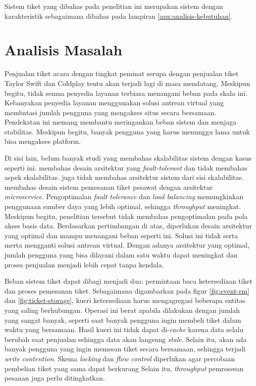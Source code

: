Sistem tiket yang dibahas pada penelitian ini merupakan sistem dengan karakteristik sebagaimana dibahas pada lampiran \ref{apx:analisis-kebutuhan}.

\section{Analisis Masalah}

Penjualan tiket acara dengan tingkat peminat serupa dengan penjualan tiket Taylor Swift dan Coldplay tentu akan terjadi lagi di masa mendatang. Meskipun begitu, tidak semua penyedia layanan terbiasa menangani beban pada skala ini. Kebanyakan penyedia layanan menggunakan solusi antrean virtual yang membatasi jumlah pengguna yang mengakses situs secara bersamaan. Pendekatan ini memang membantu meringankan beban sistem dan menjaga stabilitas. Meskipun begitu, banyak pengguna yang harus menunggu lama untuk bisa mengakses platform.

Di sisi lain, belum banyak studi yang membahas skalabilitas sistem dengan kasus seperti ini. \cite{microservicesEventDriven} membahas desain arsitektur yang \textit{fault-tolerant} dan tidak membahas aspek skalabilitas. \cite{backendForTicketing} juga tidak membahas arsitektur sistem dari sisi skalabilitas. \cite{barua2024enhancingresiliencescalabilitytravel} membahas desain sistem pemesanan tiket pesawat dengan arsitektur \textit{microservice}. Pengoptimalan \textit{fault tolerance} dan \textit{load balancing} memungkinkan penggunaan sumber daya yang lebih optimal, sehingga \textit{throughput} meningkat. Meskipun begitu, penelitian tersebut tidak membahas pengoptimalan pada pola akses basis data. Berdasarkan pertimbangan di atas, diperlukan desain arsitektur yang optimal dan mampu menangani beban seperti ini. Solusi ini tidak serta merta mengganti solusi antrean virtual. Dengan adanya arsitektur yang optimal, jumlah pengguna yang bisa dilayani dalam satu waktu dapat meningkat dan proses penjualan menjadi lebih cepat tanpa kendala.

Beban sistem tiket dapat dibagi menjadi dua: permintaan baca ketersediaan tiket dan proses pemesanan tiket. Sebagaimana digambarkan pada figur \ref{fig:event-rm} dan \ref{fig:ticket-storage}, kueri ketersediaan harus mengagregasi beberapa entitas yang saling berhubungan. Operasi ini berat apabila dilakukan dengan jumlah yang sangat banyak, seperti saat banyak pengguna ingin membeli tiket dalam waktu yang bersamaan. Hasil kueri ini tidak dapat di-\textit{cache} karena data selalu berubah saat penjualan sehingga data akan langsung \textit{stale}. Selain itu, akan ada banyak pengguna yang ingin memesan tiket secara bersamaan, sehingga terjadi \textit{write contention}. Skema \textit{locking} dan \textit{flow control} diperlukan agar percobaan pembelian tiket yang sama dapat berkurang Selain itu, \textit{throughput} pemrosesan pesanan juga perlu ditingkatkan.